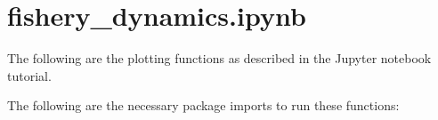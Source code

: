 \documentclass[a4paper,10pt,english]{book}
\begin{document}
\section{fishery\_dynamics.ipynb}
\label{\detokenize{A3_plotting_code:fishery-dynamics-ipynb}}
\sphinxAtStartPar
The following are the plotting functions as described in the  Jupyter notebook tutorial.

\sphinxAtStartPar
The following are the necessary package imports to run these functions:

\begin{sphinxVerbatim}[commandchars=\\\{\}]
   
   

     
\end{sphinxVerbatim}
\end{document}
